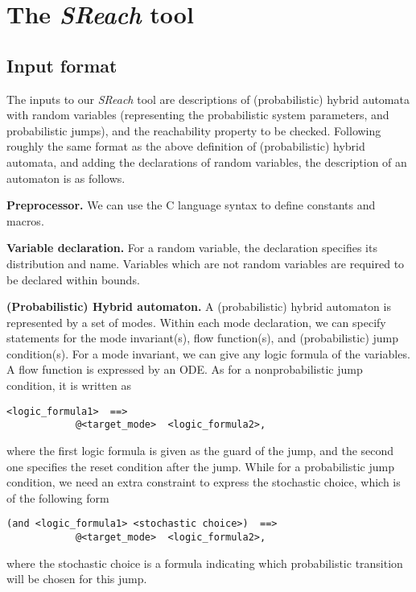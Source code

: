 \section{The {\it SReach} tool}\label{apndx:usage}
\subsection{Input format}
The inputs to our {\it SReach} tool are descriptions of (probabilistic) hybrid automata with random variables (representing the probabilistic system parameters, and probabilistic jumps), and the reachability property to be checked. Following roughly the same format as the above definition of (probabilistic) hybrid automata, and adding the declarations of random variables, the description of an automaton is as follows.

{\bf Preprocessor.} We can use the C language syntax to define constants and macros. 

{\bf Variable declaration.} For a random variable, the declaration specifies its distribution and name. Variables which are not random variables are required to be declared within bounds. 

{\bf (Probabilistic) Hybrid automaton.} A (probabilistic) hybrid automaton is represented by a set of modes. Within each mode declaration, we can specify statements for the mode invariant(s), flow function(s), and (probabilistic) jump condition(s). For a mode invariant, we can give any logic formula of the variables. A flow function is expressed by an ODE.  As for a nonprobabilistic jump condition, it is written as 
\vspace{-0.4cm}
\begin{verbatim} 
<logic_formula1>  ==> 
            @<target_mode>  <logic_formula2>,
\end{verbatim}
\vspace{-0.4cm}
where the first logic formula is given as the guard of the jump, and the second one specifies the reset condition after the jump. While for a probabilistic jump condition, we need an extra constraint to express the stochastic choice, which is of the following form
\vspace{-0.4cm}
\begin{verbatim}
(and <logic_formula1> <stochastic choice>)  ==> 
            @<target_mode>  <logic_formula2>,
\end{verbatim}
\vspace{-0.4cm}
where the stochastic choice is a formula indicating which probabilistic transition will be chosen for this jump.

